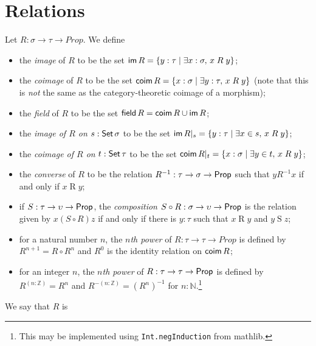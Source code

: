 \section{Relations}

\begin{definition}
  \label{def:relation_props}
  Let \( R : \sigma \to \tau \to Prop \).
  We define
  \begin{itemize}
    \item the \emph{image} of \( R \) to be the set \( \operatorname{\mathsf{im}} R = \{ y : \tau \mid \exists x : \sigma,\, x \mathrel{R} y \} \);
    \item the \emph{coimage} of \( R \) to be the set \( \operatorname{\mathsf{coim}} R = \{ x : \sigma \mid \exists y : \tau,\, x \mathrel{R} y \} \) (note that this is \emph{not} the same as the category-theoretic coimage of a morphism);
    \item the \emph{field} of \( R \) to be the set \( \operatorname{\mathsf{field}} R = \operatorname{\mathsf{coim}} R \cup \operatorname{\mathsf{im}} R \);
    \item the \emph{image of \( R \) on} \( s : \operatorname{\mathsf{Set}} \sigma \) to be the set \( \operatorname{\mathsf{im}} R|_s = \{ y : \tau \mid \exists x \in s,\, x \mathrel{R} y \} \);
    \item the \emph{coimage of \( R \) on} \( t : \operatorname{\mathsf{Set}} \tau \) to be the set \( \operatorname{\mathsf{coim}} R|_t = \{ x : \sigma \mid \exists y \in t,\, x \mathrel{R} y \} \);
    \item the \emph{converse} of \( R \) to be the relation \( R^{-1} : \tau \to \sigma \to \mathsf{Prop} \) such that \( y \mathrel{R^{-1}} x \) if and only if \( x \mathrel{R} y \);
    \item if \( S : \tau \to \upsilon \to \mathsf{Prop} \), the \emph{composition} \( S \circ R : \sigma \to \upsilon \to \mathsf{Prop} \) is the relation given by \( x \mathrel{(S\circ R)} z \) if and only if there is \( y : \tau \) such that \( x \mathrel{R} y \) and \( y \mathrel{S} z \);
    \item for a natural number \( n \), the \emph{\( n \)th power} of \( R : \tau \to \tau \to Prop \) is defined by \( R^{n+1} = R \circ R^n \) and \( R^0 \) is the identity relation on \( \operatorname{\mathsf{coim}} R \);
    \item for an integer \( n \), the \emph{\( n \)th power} of \( R : \tau \to \tau \to \mathsf{Prop} \) is defined by \( R^{(n : \mathbb Z)} = R^n \) and \( R^{-(n : \mathbb Z)} = (R^n)^{-1} \) for \( n : \mathbb N \).\footnote{This may be implemented using \texttt{Int.negInduction} from mathlib.}
  \end{itemize}
  We say that \( R \) is
  \begin{itemize}

\end{itemize}
\end{definition}
